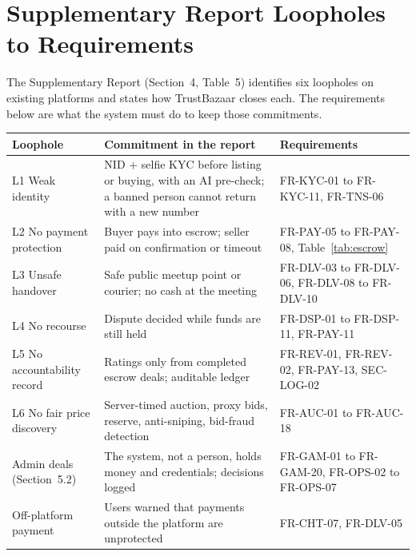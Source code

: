 \documentclass[11pt,a4paper]{report}
\begin{document}
\section{Supplementary Report Loopholes to Requirements}
The Supplementary Report (Section~4, Table~5) identifies six loopholes on existing platforms and states how TrustBazaar closes each. The requirements below are what the system must do to keep those commitments.
\begin{center}
\small
\begin{tabularx}{\textwidth}{@{}>{\raggedright\arraybackslash}p{3.6cm} X >{\raggedright\arraybackslash}p{4.4cm}@{}}
\toprule
\textbf{Loophole} & \textbf{Commitment in the report} & \textbf{Requirements} \\
\midrule
L1 Weak identity & NID + selfie KYC before listing or buying, with an AI pre-check; a banned person cannot return with a new number & FR-KYC-01 to FR-KYC-11, FR-TNS-06 \\
L2 No payment protection & Buyer pays into escrow; seller paid on confirmation or timeout & FR-PAY-05 to FR-PAY-08, Table~\ref{tab:escrow} \\
L3 Unsafe handover & Safe public meetup point or courier; no cash at the meeting & FR-DLV-03 to FR-DLV-06, FR-DLV-08 to FR-DLV-10 \\
L4 No recourse & Dispute decided while funds are still held & FR-DSP-01 to FR-DSP-11, FR-PAY-11 \\
L5 No accountability record & Ratings only from completed escrow deals; auditable ledger & FR-REV-01, FR-REV-02, FR-PAY-13, SEC-LOG-02 \\
L6 No fair price discovery & Server-timed auction, proxy bids, reserve, anti-sniping, bid-fraud detection & FR-AUC-01 to FR-AUC-18 \\
Admin deals (Section~5.2) & The system, not a person, holds money and credentials; decisions logged & FR-GAM-01 to FR-GAM-20, FR-OPS-02 to FR-OPS-07 \\
Off-platform payment & Users warned that payments outside the platform are unprotected & FR-CHT-07, FR-DLV-05 \\
\bottomrule
\end{tabularx}
\end{center}
\end{document}
